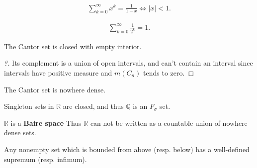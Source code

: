 \begin{proposition}

\begin{align*}
\sum_{k=0}^\infty x^k = \frac 1 {1-x} \iff {\left\lvert {x} \right\rvert} < 1
.\end{align*}

\end{proposition}

\begin{corollary}[?]

\begin{align*}
\sum_{k=0}^\infty \frac 1 {2^k} = 1
.\end{align*}

\end{corollary}

\begin{proposition}[?]

The Cantor set is closed with empty interior.

\end{proposition}

\begin{proof}[?]

Its complement is a union of open intervals, and can't contain an
interval since intervals have positive measure and \(m(C_n)\) tends to
zero.

\end{proof}

\begin{corollary}[?]

The Cantor set is nowhere dense.

\end{corollary}

\begin{proposition}[?]

Singleton sets in \({\mathbb{R}}\) are closed, and thus \({\mathbb{Q}}\)
is an \(F_\sigma\) set.

\end{proposition}

\begin{theorem}[Baire]

\({\mathbb{R}}\) is a \textbf{Baire space} Thus \({\mathbb{R}}\) can not
be written as a countable union of nowhere dense sets.

\end{theorem}

\begin{lemma}[?]

Any nonempty set which is bounded from above (resp. below) has a
well-defined supremum (resp. infimum).

\end{lemma}

